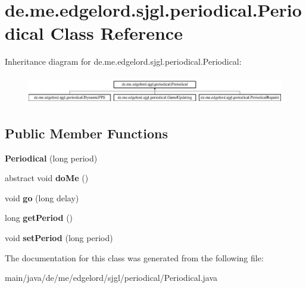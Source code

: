 \hypertarget{classde_1_1me_1_1edgelord_1_1sjgl_1_1periodical_1_1_periodical}{}\section{de.\+me.\+edgelord.\+sjgl.\+periodical.\+Periodical Class Reference}
\label{classde_1_1me_1_1edgelord_1_1sjgl_1_1periodical_1_1_periodical}
Inheritance diagram for de.\+me.\+edgelord.\+sjgl.\+periodical.\+Periodical\+:\begin{figure}[H]
\begin{center}
\leavevmode
\includegraphics[height=1.269841cm]{classde_1_1me_1_1edgelord_1_1sjgl_1_1periodical_1_1_periodical}
\end{center}
\end{figure}
\subsection*{Public Member Functions}
\begin{DoxyCompactItemize}
\item 
\mbox{\label{classde_1_1me_1_1edgelord_1_1sjgl_1_1periodical_1_1_periodical_ac594baa332a306dcccc50e679bcf87b3}} 
{\bfseries Periodical} (long period)
\item 
\mbox{\label{classde_1_1me_1_1edgelord_1_1sjgl_1_1periodical_1_1_periodical_ac08b84b12b1788f021477b2c691c64be}} 
abstract void {\bfseries do\+Me} ()
\item 
\mbox{\label{classde_1_1me_1_1edgelord_1_1sjgl_1_1periodical_1_1_periodical_aa6f6ae605de49d429effb689699b5206}} 
void {\bfseries go} (long delay)
\item 
\mbox{\label{classde_1_1me_1_1edgelord_1_1sjgl_1_1periodical_1_1_periodical_a5580b49dc545b0d076a5914c59419f7e}} 
long {\bfseries get\+Period} ()
\item 
\mbox{\label{classde_1_1me_1_1edgelord_1_1sjgl_1_1periodical_1_1_periodical_a3d31e7c9cb573192aaedeb10d149574a}} 
void {\bfseries set\+Period} (long period)
\end{DoxyCompactItemize}


The documentation for this class was generated from the following file\+:\begin{DoxyCompactItemize}
\item 
main/java/de/me/edgelord/sjgl/periodical/Periodical.\+java\end{DoxyCompactItemize}

